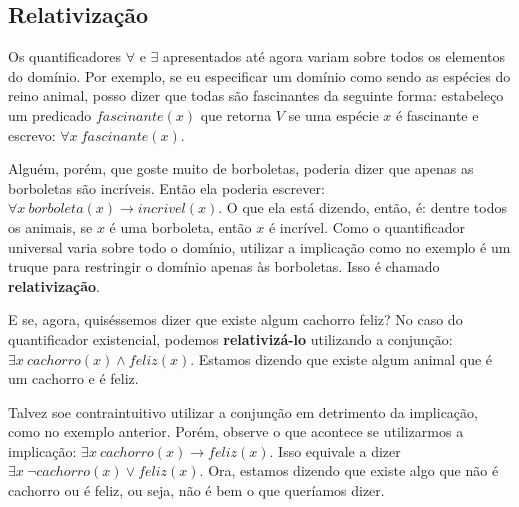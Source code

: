     \subsection{Relativização}

    Os quantificadores $\forall$ e $\exists$ apresentados até agora variam sobre todos os elementos do domínio.
    Por exemplo, se eu especificar um domínio como sendo as espécies do reino animal, posso dizer que todas são fascinantes da seguinte forma:
    estabeleço um predicado $fascinante(x)$ que retorna $V$ se uma espécie $x$ é fascinante e escrevo: $\forall x \ fascinante(x)$.
    
    Alguém, porém, que goste muito de borboletas, poderia dizer que apenas as borboletas são incríveis. Então ela poderia escrever:
    $\forall x \ borboleta(x) \rightarrow incrivel(x)$. O que ela está dizendo, então, é: dentre todos os animais, se $x$ é uma borboleta, então $x$ é incrível.
    Como o quantificador universal varia sobre todo o domínio, utilizar a implicação como no exemplo é um truque para restringir o domínio apenas às borboletas.
    Isso é chamado \textbf{relativização}.

    E se, agora, quiséssemos dizer que existe algum cachorro feliz? No caso do quantificador existencial, podemos \textbf{relativizá-lo} utilizando a conjunção:
    $\exists x \ cachorro(x) \land feliz(x)$. Estamos dizendo que existe algum animal que é um cachorro e é feliz.

    Talvez soe contraintuitivo utilizar a conjunção em detrimento da implicação, como no exemplo anterior. Porém, observe o que acontece se utilizarmos a implicação:
    $\exists x \ cachorro(x) \rightarrow feliz(x)$. Isso equivale a dizer $\exists x \ \lnot cachorro(x) \lor feliz(x)$. Ora, estamos dizendo que existe algo que não é cachorro ou é feliz, ou seja, não é bem o que queríamos dizer.
